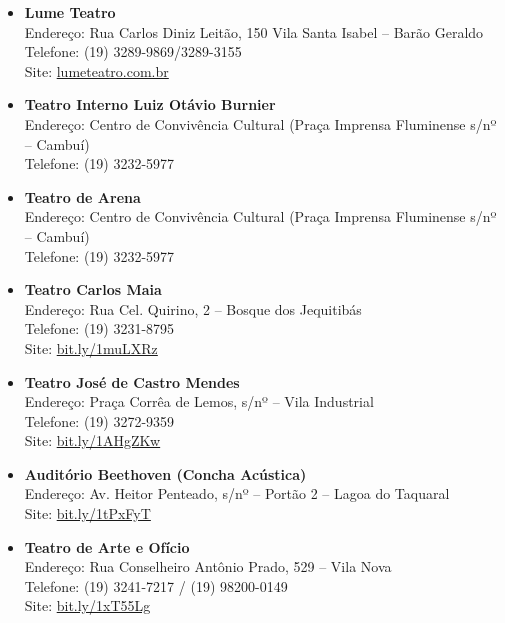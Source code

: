\begin{itemize}
    \item   \textbf{Lume Teatro}
        \\Endereço:  Rua Carlos Diniz Leitão, 150 Vila Santa Isabel -- Barão Geraldo
        \\Telefone: (19) 3289-9869/3289-3155
        \\Site: \url{lumeteatro.com.br}

    \item   \textbf{Teatro Interno Luiz Otávio Burnier}
        \\Endereço: Centro de Convivência Cultural (Praça Imprensa Fluminense s/nº -- Cambuí)
        \\Telefone: (19) 3232-5977 %

    \item   \textbf{Teatro de Arena}
        \\Endereço: Centro de Convivência Cultural (Praça Imprensa Fluminense s/nº -- Cambuí)
        \\Telefone: (19) 3232-5977

    \item   \textbf{Teatro Carlos Maia}
        \\Endereço: Rua Cel. Quirino, 2 -- Bosque dos Jequitibás
        \\Telefone: (19) 3231-8795
        \\Site: \url{bit.ly/1muLXRz}

    \item   \textbf{Teatro José de Castro Mendes}
        \\Endereço: Praça Corrêa de Lemos, s/nº -- Vila Industrial
        \\Telefone: (19) 3272-9359
        \\Site: \url{bit.ly/1AHgZKw}

    \item   \textbf{Auditório Beethoven (Concha Acústica)}
        \\Endereço: Av. Heitor Penteado, s/nº -- Portão 2 -- Lagoa do Taquaral
        \\Site: \url{bit.ly/1tPxFyT}

    \item   \textbf{Teatro de Arte e Ofício}
        \\Endereço: Rua Conselheiro Antônio Prado, 529 -- Vila Nova
        \\Telefone: (19) 3241-7217 / (19) 98200-0149
        \\Site: \url{bit.ly/1xT55Lg}


\end{itemize}
